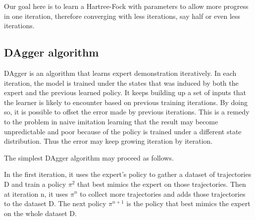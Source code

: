 \documentclass[twoside]{article}
\begin{document}
Our goal here is to learn a Hartree-Fock with parameters to allow more progress in one iteration, therefore converging with less iterations, say half or even less iterations.  








\subsection{DAgger algorithm}
DAgger is an algorithm that learns expert demonstration iteratively. In each iteration, the model is trained under the states that was induced by both the expert and the previous learned policy. It keeps building up a set of inputs that the learner is likely to encounter based on previous training iterations. By doing so, it is possible to offset the error made by previous iterations. This is a remedy to the problem in naive imitation learning that the result may become unpredictable and poor because of the policy is trained under a different state distribution. Thus the error may keep growing iteration by iteration.

The simplest DAgger algorithm may proceed as follows.

In the first iteration, it uses the expert’s policy to gather
a dataset of trajectories D and train a policy $\pi^2$ that best
mimics the expert on those trajectories. Then at iteration
n, it uses $\pi^n$ to collect more trajectories and adds those
trajectories to the dataset D. The next policy $\pi^{n+1}$ is the
policy that best mimics the expert on the whole dataset D.
\end{document}
